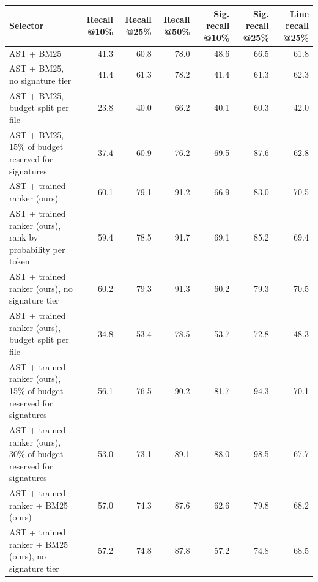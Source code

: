 \begin{tabular}{lrrrrrr}
\toprule
Selector & Recall @10\% & Recall @25\% & Recall @50\% & Sig. recall @10\% & Sig. recall @25\% & Line recall @25\% \\
\midrule
AST + BM25 & 41.3 & 60.8 & 78.0 & 48.6 & 66.5 & 61.8 \\
AST + BM25, no signature tier & 41.4 & 61.3 & 78.2 & 41.4 & 61.3 & 62.3 \\
AST + BM25, budget split per file & 23.8 & 40.0 & 66.2 & 40.1 & 60.3 & 42.0 \\
AST + BM25, 15\% of budget reserved for signatures & 37.4 & 60.9 & 76.2 & 69.5 & 87.6 & 62.8 \\
AST + trained ranker (ours) & 60.1 & 79.1 & 91.2 & 66.9 & 83.0 & 70.5 \\
AST + trained ranker (ours), rank by probability per token & 59.4 & 78.5 & 91.7 & 69.1 & 85.2 & 69.4 \\
AST + trained ranker (ours), no signature tier & 60.2 & 79.3 & 91.3 & 60.2 & 79.3 & 70.5 \\
AST + trained ranker (ours), budget split per file & 34.8 & 53.4 & 78.5 & 53.7 & 72.8 & 48.3 \\
AST + trained ranker (ours), 15\% of budget reserved for signatures & 56.1 & 76.5 & 90.2 & 81.7 & 94.3 & 70.1 \\
AST + trained ranker (ours), 30\% of budget reserved for signatures & 53.0 & 73.1 & 89.1 & 88.0 & 98.5 & 67.7 \\
AST + trained ranker + BM25 (ours) & 57.0 & 74.3 & 87.6 & 62.6 & 79.8 & 68.2 \\
AST + trained ranker + BM25 (ours), no signature tier & 57.2 & 74.8 & 87.8 & 57.2 & 74.8 & 68.5 \\
\bottomrule
\end{tabular}
